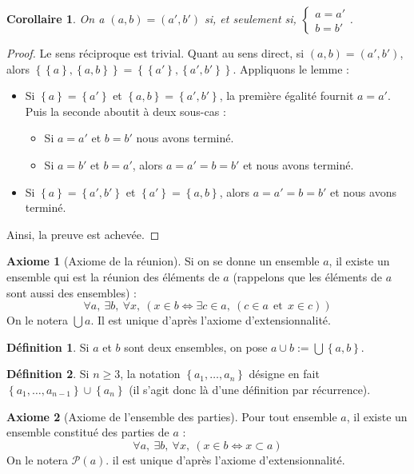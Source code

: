 \documentclass[french]{book}
\theoremstyle{plain}
\newtheorem{cor}{Corollaire}[chapter]
\theoremstyle{definition}
\newtheorem{dfn}{Définition}[chapter]
\newtheorem{ax}{Axiome}[chapter]
\theoremstyle{remark}
\begin{document}
\begin{cor}
	On a $(a,b)=(a',b')$ si, et seulement si, $\displaystyle\begin{cases}
		a=a' \\ b=b'
	\end{cases}$.
\end{cor}
\begin{proof}
	Le sens réciproque est trivial. Quant au sens direct, si $(a,b)=(a',b')$, alors $\left\{\left\{a\right\},\left\{a,b\right\}\right\}=\left\{\left\{a'\right\},\left\{a',b'\right\}\right\}$. Appliquons le lemme : 
	\begin{itemize}
		\item Si $\left\{a\right\}=\left\{a'\right\}$ et $\left\{a,b\right\}=\left\{a',b'\right\}$, la première égalité fournit $a=a'$. Puis la seconde aboutit à deux sous-cas : 
		\begin{itemize}
			\item[--] Si $a=a'$ et $b=b'$ nous avons terminé.
			\item[--] Si $a=b'$ et $b=a'$, alors $a=a'=b=b'$ et nous avons terminé.
		\end{itemize}
		\item Si $\left\{a\right\}=\left\{a',b'\right\}$ et $\left\{a'\right\}=\left\{a,b\right\}$, alors $a=a'=b=b'$ et nous avons terminé.
	\end{itemize}
	Ainsi, la preuve est achevée.
\end{proof}
\begin{ax}[Axiome de la réunion]
	Si on se donne un ensemble $a$, il existe un ensemble qui est la réunion des éléments de $a$ (rappelons que les éléments de $a$ sont aussi des ensembles) : $$\forall a,\ \exists b,\ \forall x,\ \left(x\in b\iff \exists c\in a,\ \left(c\in a \ \ \text{et}\ \ x\in c\right)\right)$$ On le notera $\displaystyle\bigcup a$. Il est unique d'après l'axiome d'extensionnalité.
\end{ax}
\begin{dfn}
	Si $a$ et $b$ sont deux ensembles, on pose $a\cup b:=\displaystyle\bigcup \left\{a,b\right\}$.
\end{dfn}
\begin{dfn}
	Si $n\geqslant3$, la notation $\left\{a_1,\ldots,a_n\right\}$ désigne en fait $\left\{a_1,\ldots,a_{n-1}\right\}\cup\left\{a_n\right\}$ (il s'agit donc là d'une définition par récurrence).
\end{dfn}
\begin{ax}[Axiome de l'ensemble des parties]
	Pour tout ensemble $a$, il existe un ensemble constitué des parties de $a$ : $$\forall a,\ \exists b,\ \forall x,\ \left(x\in b\iff x\subset a\right)$$ On le notera $\mathcal{P}(a)$. il est unique d'après l'axiome d'extensionnalité.
\end{ax}
\end{document}
